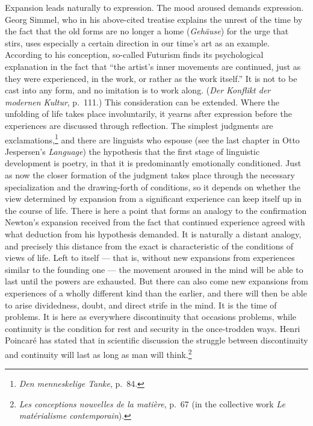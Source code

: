 \documentclass[12pt]{book}
\newcommand{\opage}[1]{\marginnote{\footnotesize\textit{[#1]}}}
\begin{document}
Expansion leads naturally to expression. The mood aroused demands expression. Georg Simmel, who in his
above-cited treatise explains the unrest of the time by the fact that the old forms are no longer a home
(\textit{Gehäuse}) for the urge that stirs, uses especially a certain direction in our time's art as an
example. According to his conception, so-called Futurism finds its psychological explanation in the fact
that ``the artist's inner movements are continued, just as they were experienced, in the work, or rather as
the work itself.'' It is not to be cast into any form, and no imitation is to work along. (\textit{Der
Konflikt der modernen Kultur}, p.\ 111.) This consideration can be extended. Where the unfolding of life
\opage{58}takes place involuntarily, it yearns after expression before the experiences are discussed through
reflection. The simplest judgments are exclamations,\footnote{\textit{Den menneskelige Tanke}, p.\ 84.} and
there are linguists who espouse (see the last chapter in Otto Jespersen's \textit{Language}) the hypothesis
that the first stage of linguistic development is poetry, in that it is predominantly emotionally
conditioned. Just as now the closer formation of the judgment takes place through the necessary
specialization and the drawing-forth of conditions, so it depends on whether the view determined by
expansion from a significant experience can keep itself up in the course of life. There is here a point that
forms an analogy to the confirmation Newton's expansion received from the fact that continued experience
agreed with what deduction from his hypothesis demanded. It is naturally a distant analogy, and precisely
this distance from the exact is characteristic of the conditions of views of life. Left to itself --- that
is, without new expansions from experiences similar to the founding one --- the movement aroused in the
mind will be able to last until the powers are exhausted. But there can also come new expansions from
experiences of a wholly different kind than the earlier, and there will then be able to arise dividedness,
doubt, and direct strife in the mind. It is the time of problems. It is here as everywhere discontinuity
that occasions problems, while continuity is the condition for rest and security in the once-trodden ways.
Henri Poincaré has stated that in scientific discussion the struggle between discontinuity and continuity
will last as long as man will think.\footnote{\textit{Les conceptions nouvelles de la matière}, p.\ 67 (in
the collective work \textit{Le matérialisme contemporain}).}
\end{document}
